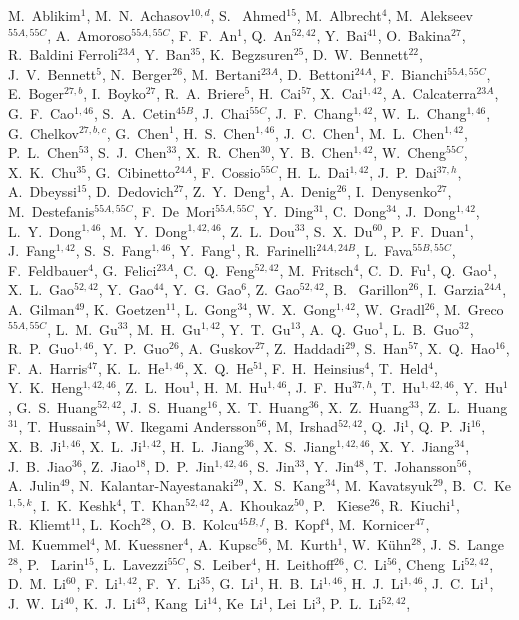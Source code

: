 \begin{small}
\begin{center}
M.~Ablikim$^{1}$, M.~N.~Achasov$^{10,d}$, S. ~Ahmed$^{15}$, M.~Albrecht$^{4}$, M.~Alekseev$^{55A,55C}$, A.~Amoroso$^{55A,55C}$, F.~F.~An$^{1}$, Q.~An$^{52,42}$, Y.~Bai$^{41}$, O.~Bakina$^{27}$, R.~Baldini Ferroli$^{23A}$, Y.~Ban$^{35}$, K.~Begzsuren$^{25}$, D.~W.~Bennett$^{22}$, J.~V.~Bennett$^{5}$, N.~Berger$^{26}$, M.~Bertani$^{23A}$, D.~Bettoni$^{24A}$, F.~Bianchi$^{55A,55C}$, E.~Boger$^{27,b}$, I.~Boyko$^{27}$, R.~A.~Briere$^{5}$, H.~Cai$^{57}$, X.~Cai$^{1,42}$, A.~Calcaterra$^{23A}$, G.~F.~Cao$^{1,46}$, S.~A.~Cetin$^{45B}$, J.~Chai$^{55C}$, J.~F.~Chang$^{1,42}$, W.~L.~Chang$^{1,46}$, G.~Chelkov$^{27,b,c}$, G.~Chen$^{1}$, H.~S.~Chen$^{1,46}$, J.~C.~Chen$^{1}$, M.~L.~Chen$^{1,42}$, P.~L.~Chen$^{53}$, S.~J.~Chen$^{33}$, X.~R.~Chen$^{30}$, Y.~B.~Chen$^{1,42}$, W.~Cheng$^{55C}$, X.~K.~Chu$^{35}$, G.~Cibinetto$^{24A}$, F.~Cossio$^{55C}$, H.~L.~Dai$^{1,42}$, J.~P.~Dai$^{37,h}$, A.~Dbeyssi$^{15}$, D.~Dedovich$^{27}$, Z.~Y.~Deng$^{1}$, A.~Denig$^{26}$, I.~Denysenko$^{27}$, M.~Destefanis$^{55A,55C}$, F.~De~Mori$^{55A,55C}$, Y.~Ding$^{31}$, C.~Dong$^{34}$, J.~Dong$^{1,42}$, L.~Y.~Dong$^{1,46}$, M.~Y.~Dong$^{1,42,46}$, Z.~L.~Dou$^{33}$, S.~X.~Du$^{60}$, P.~F.~Duan$^{1}$, J.~Fang$^{1,42}$, S.~S.~Fang$^{1,46}$, Y.~Fang$^{1}$, R.~Farinelli$^{24A,24B}$, L.~Fava$^{55B,55C}$, F.~Feldbauer$^{4}$, G.~Felici$^{23A}$, C.~Q.~Feng$^{52,42}$, M.~Fritsch$^{4}$, C.~D.~Fu$^{1}$, Q.~Gao$^{1}$, X.~L.~Gao$^{52,42}$, Y.~Gao$^{44}$, Y.~G.~Gao$^{6}$, Z.~Gao$^{52,42}$, B. ~Garillon$^{26}$, I.~Garzia$^{24A}$, A.~Gilman$^{49}$, K.~Goetzen$^{11}$, L.~Gong$^{34}$, W.~X.~Gong$^{1,42}$, W.~Gradl$^{26}$, M.~Greco$^{55A,55C}$, L.~M.~Gu$^{33}$, M.~H.~Gu$^{1,42}$, Y.~T.~Gu$^{13}$, A.~Q.~Guo$^{1}$, L.~B.~Guo$^{32}$, R.~P.~Guo$^{1,46}$, Y.~P.~Guo$^{26}$, A.~Guskov$^{27}$, Z.~Haddadi$^{29}$, S.~Han$^{57}$, X.~Q.~Hao$^{16}$, F.~A.~Harris$^{47}$, K.~L.~He$^{1,46}$, X.~Q.~He$^{51}$, F.~H.~Heinsius$^{4}$, T.~Held$^{4}$, Y.~K.~Heng$^{1,42,46}$, Z.~L.~Hou$^{1}$, H.~M.~Hu$^{1,46}$, J.~F.~Hu$^{37,h}$, T.~Hu$^{1,42,46}$, Y.~Hu$^{1}$, G.~S.~Huang$^{52,42}$, J.~S.~Huang$^{16}$, X.~T.~Huang$^{36}$, X.~Z.~Huang$^{33}$, Z.~L.~Huang$^{31}$, T.~Hussain$^{54}$, W.~Ikegami Andersson$^{56}$, M,~Irshad$^{52,42}$, Q.~Ji$^{1}$, Q.~P.~Ji$^{16}$, X.~B.~Ji$^{1,46}$, X.~L.~Ji$^{1,42}$, H.~L.~Jiang$^{36}$, X.~S.~Jiang$^{1,42,46}$, X.~Y.~Jiang$^{34}$, J.~B.~Jiao$^{36}$, Z.~Jiao$^{18}$, D.~P.~Jin$^{1,42,46}$, S.~Jin$^{33}$, Y.~Jin$^{48}$, T.~Johansson$^{56}$, A.~Julin$^{49}$, N.~Kalantar-Nayestanaki$^{29}$, X.~S.~Kang$^{34}$, M.~Kavatsyuk$^{29}$, B.~C.~Ke$^{1,5,k}$, I.~K.~Keshk$^{4}$, T.~Khan$^{52,42}$, A.~Khoukaz$^{50}$, P. ~Kiese$^{26}$, R.~Kiuchi$^{1}$, R.~Kliemt$^{11}$, L.~Koch$^{28}$, O.~B.~Kolcu$^{45B,f}$, B.~Kopf$^{4}$, M.~Kornicer$^{47}$, M.~Kuemmel$^{4}$, M.~Kuessner$^{4}$, A.~Kupsc$^{56}$, M.~Kurth$^{1}$, W.~K\"uhn$^{28}$, J.~S.~Lange$^{28}$, P. ~Larin$^{15}$, L.~Lavezzi$^{55C}$, S.~Leiber$^{4}$, H.~Leithoff$^{26}$, C.~Li$^{56}$, Cheng~Li$^{52,42}$, D.~M.~Li$^{60}$, F.~Li$^{1,42}$, F.~Y.~Li$^{35}$, G.~Li$^{1}$, H.~B.~Li$^{1,46}$, H.~J.~Li$^{1,46}$, J.~C.~Li$^{1}$, J.~W.~Li$^{40}$, K.~J.~Li$^{43}$, Kang~Li$^{14}$, Ke~Li$^{1}$, Lei~Li$^{3}$, P.~L.~Li$^{52,42}$, 
\end{center}
\end{small}
